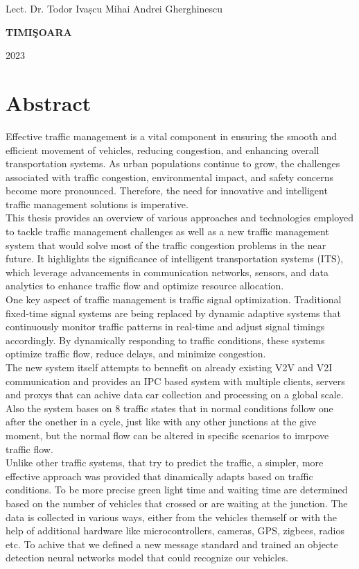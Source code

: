 \documentclass[17pt]{report}
\begin{document}
{\large{}

\noindent Lect. Dr. Todor Ivașcu \hfill 
\noindent Mihai Andrei Gherghinescu
}



\vfill
\begin{center}
{\bf TIMI\c SOARA

2023}
\end{center}

\newpage
\normalsize{}

\section*{Abstract}
\indent \indent
Effective traffic management is a vital component in ensuring
the smooth and efficient movement of vehicles, reducing congestion,
and enhancing overall transportation systems. As urban populations
continue to grow, the challenges associated with traffic congestion,
environmental impact, and safety concerns become more pronounced.
Therefore, the need for innovative and intelligent traffic management
solutions is imperative.\\
\indent
This thesis provides an overview of various approaches and
technologies employed to tackle traffic management challenges as 
well as a new traffic management system that would solve most of 
the traffic congestion problems in the near future. It highlights
the significance of intelligent transportation systems (ITS),
which leverage advancements in communication networks, sensors,
and data analytics to enhance traffic flow and optimize resource
allocation.\\
\indent
One key aspect of traffic management is traffic signal optimization.
Traditional fixed-time signal systems are being replaced by dynamic
adaptive systems that continuously monitor traffic patterns in
real-time and adjust signal timings accordingly. By dynamically
responding to traffic conditions, these systems optimize traffic flow,
reduce delays, and minimize congestion.\\
\indent
The new system itself attempts to bennefit on already existing V2V and 
V2I communication and provides an IPC based system with multiple 
clients, servers and proxys that can achive data car collection and processing
on a global scale. Also the system bases on 8 traffic states that 
in normal conditions follow one after the onether in a cycle, just like
with any other junctions at the give moment, but the normal 
flow can be altered in specific scenarios to imrpove traffic flow.\\
\indent
Unlike other traffic systems, that try to predict the traffic, a simpler,
more effective approach was provided that dinamically adapts based on 
traffic conditions. To be more precise green light time and waiting time 
are determined based on the number of vehicles that crossed or are 
waiting at the junction. The data is collected in various ways, either
from the vehicles themself or with the help of additional hardware
like microcontrollers, cameras, GPS, zigbees, radios etc. To achive
that we defined a new message standard and trained an objecte detection
neural networks model that could recognize our vehicles.
\end{document}
